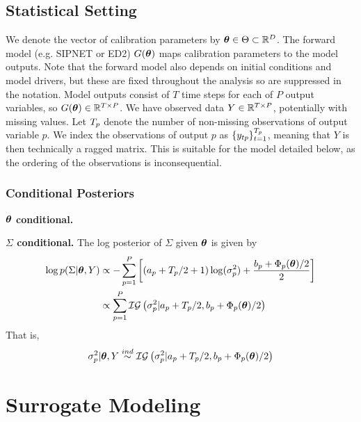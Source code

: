 \documentclass[12pt]{article}
\begin{document}
\subsection{Statistical Setting}
We denote the vector of calibration parameters by $\boldsymbol{\theta} \in \Theta \subset \mathbb{R}^{D}$. The forward model (e.g. SIPNET or ED2) $G(\boldsymbol{\theta})$ maps calibration parameters to the model outputs. Note that the forward 
model also depends on initial conditions and model drivers, but these are fixed throughout the analysis so are suppressed in the notation. Model outputs consist 
of $T$ time steps for each of $P$ output variables, so $G(\boldsymbol{\theta}) \in \mathbb{R}^{T \times P}$. We have observed data $Y \in \mathbb{R}^{T \times P}$, potentially with missing values. Let $T_{p}$ denote the number 
of non-missing observations of output variable $p$. We index the observations of output $p$ as $\{y_{tp}\}_{t = 1}^{T_{p}}$, meaning that $Y$ is then technically a ragged matrix. 
This is suitable for the model detailed below, as the ordering of the observations is inconsequential. 

\subsubsection{Conditional Posteriors}

\bigskip
\noindent
\textbf{$\boldsymbol{\theta}$ conditional.}

\bigskip
\noindent
\textbf{$\Sigma$ conditional.}
The log posterior of $\Sigma$ given $\boldsymbol{\theta}$ is given by 
\begin{align*}
\log p(\Sigma|\boldsymbol{\theta}, Y) &\propto -\sum_{p = 1}^{P} \left[\left(a_p + T_{p}/2 + 1 \right)\log(\sigma_p^2) + \frac{b_p + \Phi_p(\boldsymbol{\theta})/2}{2} \right] \\
				      &\propto \sum_{p = 1}^{P} \mathcal{IG}\left(\sigma_p^2|a_p + T_{p}/2, b_p + \Phi_p(\boldsymbol{\theta})/2 \right)
\end{align*}
That is, 
\begin{align*}
\sigma_p^2|\boldsymbol{\theta}, Y \overset{ind}{\sim} \mathcal{IG}\left(\sigma_p^2|a_p + T_{p}/2, b_p + \Phi_p(\boldsymbol{\theta})/2 \right)
\end{align*}

\section{Surrogate Modeling}
\end{document}
